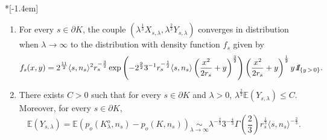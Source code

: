 \documentclass[AHL,Unicode,longabstracts,published]{cedram}
\newcommand{\indicat}{{\text{1}}\negthickspace\text{I}}
\newcommand{\E}{\mathbb{E}}
\newcommand{\noi}{\noindent}
\newcommand*{\romanenumi}{\renewcommand*{\theenumi}{\roman{enumi}}}
\begin{document}
\begin{prop}\label{prop:supportsmooth}\ \\*[-1.4em]
\begin{enumerate}\romanenumi
\item \label{eq:ftheta}For every $s\in\partial K$, the couple $(\lambda^{\frac1{3}}X_{s,\lambda}, \lambda^{\frac{2}{3}}Y_{s,\lambda})$ converges in distribution when $\lambda\to\infty$ to the distribution with density function $f_s$ given by
\[
f_s(x,y)=2^{\frac{11}{2}}\langle s,n_s\rangle^2 r_s^{-\frac{3}{2}}\exp\left(-2^{\frac{9}{2}} 3^{-1}r_s^{-\frac1{2}}\langle s,n_s\rangle
\left(\frac{x^2}{2r_s}+y\right)^{\frac{3}{2}}\right)\left(\frac{x^2}{2r_s}+y\right)^{\frac1{2}}y{\emph{\indicat}}_{\{y\,>\,0\}}.
\]
\item \label{eq:convmean}There exists $C>0$ such that for every $s\in\partial K$ and $\lambda>0$, $\lambda^{\frac{2}{3}}\E(Y_{s,\lambda})\le C$. Moreover, for every $s\in\partial K$,
\[
\E(Y_{s,\lambda})=\E\left(p_o\left(K_{\lambda}^o,n_s\right)-p_o(K,n_s)\right)\underset{\lambda\to\infty}{\sim}\lambda^{-\frac{2}{3}}3^{-\frac{4}{3}}\Gamma\left(\frac{2}{3}\right) r_s^{\frac1{3}}\langle s,n_s\rangle^{-\frac{2}{3}}.
\]
\end{enumerate}
\end{prop}
\end{document}

